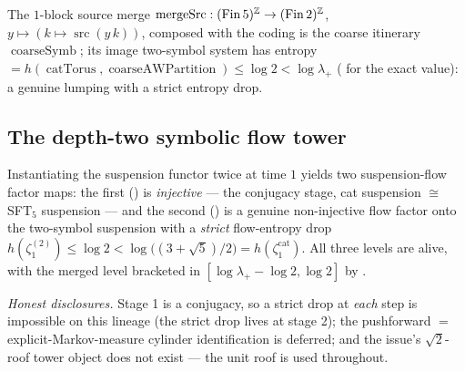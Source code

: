 \begin{theorem}\label{ksEntropy_mapCoarseSymb_le}
  \leanok
  The \(1\)-block source merge
  \(\operatorname{mergeSrc} : (\operatorname{Fin} 5)^{\mathbb{Z}}\to(\operatorname{Fin} 2)^{\mathbb{Z}}\),
  \(y\mapsto(k\mapsto\operatorname{src}(y\,k))\), composed with the coding is the coarse itinerary
  \(\operatorname{coarseSymb}\); its image two-symbol system has entropy
  \(= h(\operatorname{catTorus}, \operatorname{coarseAWPartition})\le\log 2 < \log\lambda_+\)
  ( for the exact value): a genuine
  lumping with a strict entropy drop.
\end{theorem}

\subsection{The depth-two symbolic flow tower}

\begin{theorem}\label{catSymbolicFlowTower}
  \leanok
  Instantiating the suspension functor twice at time \(1\) yields two suspension-flow factor maps: the
  first () is \emph{injective} --- the conjugacy stage,
  cat suspension \(\cong\) SFT\(_5\) suspension --- and the second
  () is a genuine non-injective flow factor onto the
  two-symbol suspension with a \emph{strict} flow-entropy drop
  \(h(\zeta^{(2)}_1)\le\log 2 < \log\!\big((3+\sqrt5)/2\big) = h(\zeta^{\mathrm{cat}}_1)\). All three
  levels are alive, with the merged level bracketed in \([\log\lambda_+ - \log 2, \log 2]\) by
  .
\end{theorem}

\emph{Honest disclosures.} Stage 1 is a conjugacy, so a strict drop at \emph{each} step is impossible
on this lineage (the strict drop lives at stage 2); the pushforward
\(=\) explicit-Markov-measure cylinder identification is deferred; and the issue's \(\sqrt2\)-roof
tower object does not exist --- the unit roof is used throughout.
